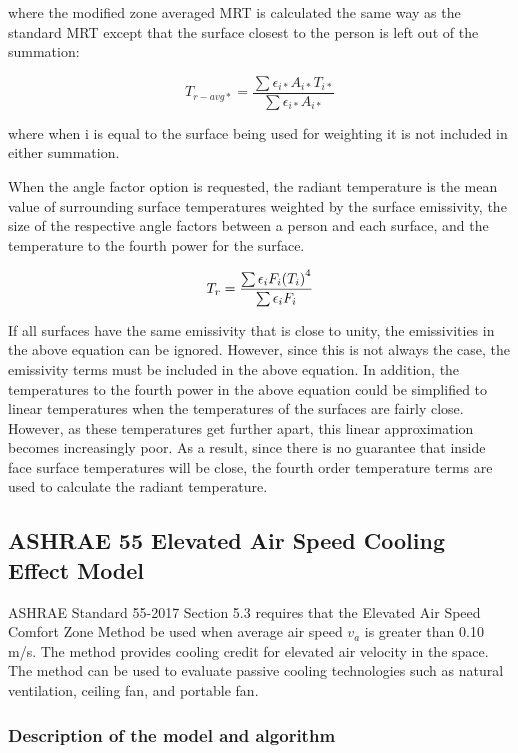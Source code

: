 where the modified zone averaged MRT is calculated the same way as the standard MRT except that the surface closest to the person is left out of the summation:

\begin{equation}
{T_{r - avg*}} = \frac{\sum{{{\epsilon}_{i*}}{{A}_{i*}}{{T}_{i*}}}}{\sum{{{\epsilon}_{i*}}{{A}_{i*}}}}
\end{equation}

where when i is equal to the surface being used for weighting it is not included in either summation.

When the angle factor option is requested, the radiant temperature is the mean value of surrounding surface temperatures weighted by the surface emissivity, the size of the respective angle factors between a person and each surface, and the temperature to the fourth power for the surface.

\begin{equation}
{T_r} = \frac{\sum{{\epsilon_{i}}{F_{i}}{\left({T_{i}}\right)^4}}}{\sum{{\epsilon_{i}}{F_{i}}}}
\end{equation}

If all surfaces have the same emissivity that is close to unity, the emissivities in the above equation can be ignored.  However, since this is not always the case, the emissivity terms must be included in the above equation.  In addition, the temperatures to the fourth power in the above equation could be simplified to linear temperatures when the temperatures of the surfaces are fairly close.  However, as these temperatures get further apart, this linear approximation becomes increasingly poor.  As a result, since there is no guarantee that inside face surface temperatures will be close, the fourth order temperature terms are used to calculate the radiant temperature.

\subsection{ASHRAE 55 Elevated Air Speed Cooling Effect Model}\label{elevated-air-speed-ce-model}

ASHRAE Standard 55-2017 Section 5.3 requires that the Elevated Air Speed Comfort Zone Method be used when average air speed \(v_{a}\) is greater than 0.10 m/s. The method provides cooling credit for elevated air velocity in the space. The method can be used to evaluate passive cooling technologies such as natural ventilation, ceiling fan, and portable fan.

\subsubsection{Description of the model and algorithm}\label{description-of-the-model-and-algorithm-4}

